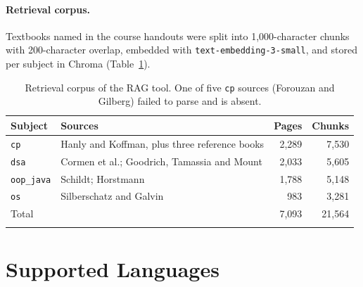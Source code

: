 \documentclass[pdflatex,sn-mathphys-num]{sn-jnl}%
\theoremstyle{thmstyleone}%
\theoremstyle{thmstyletwo}%
\theoremstyle{thmstylethree}%
\begin{document}
\begin{appendices}
\paragraph{Retrieval corpus.} Textbooks named in the course handouts were split into 1,000-character
chunks with 200-character overlap, embedded with \texttt{text-embedding-3-small}, and stored per
subject in Chroma (Table~\ref{tab:corpus}).

\begin{table}[h]
\caption{Retrieval corpus of the RAG tool. One of five \texttt{cp} sources (Forouzan and Gilberg)
failed to parse and is absent.}\label{tab:corpus}
\footnotesize
\begin{tabular*}{\textwidth}{@{\extracolsep\fill}llrr}
\toprule
Subject & Sources & Pages & Chunks \\
\midrule
\texttt{cp} & Hanly and Koffman, plus three reference books & 2,289 & 7,530 \\
\texttt{dsa} & Cormen et al.; Goodrich, Tamassia and Mount & 2,033 & 5,605 \\
\texttt{oop\_java} & Schildt; Horstmann & 1,788 & 5,148 \\
\texttt{os} & Silberschatz and Galvin & 983 & 3,281 \\
\midrule
Total & & 7,093 & 21,564 \\
\botrule
\end{tabular*}
\end{table}

\section{Supported Languages}\label{app:languages}


\end{appendices}
\end{document}
